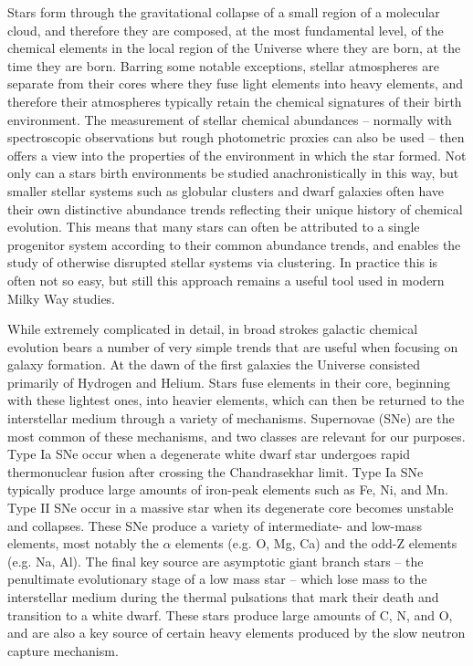 Stars form through the gravitational collapse of a small region of a molecular cloud, and therefore they are composed, at the most fundamental level, of the chemical elements in the local region of the Universe where they are born, at the time they are born. Barring some notable exceptions, stellar atmospheres are separate from their cores where they fuse light elements into heavy elements, and therefore their atmospheres typically retain the chemical signatures of their birth environment. The measurement of stellar chemical abundances -- normally with spectroscopic observations but rough photometric proxies can also be used -- then offers a view into the properties of the environment in which the star formed. Not only can a stars birth environments be studied anachronistically in this way, but smaller stellar systems such as globular clusters and dwarf galaxies often have their own distinctive abundance trends reflecting their unique history of chemical evolution. This means that many stars can often be attributed to a single progenitor system according to their common abundance trends, and enables the study of otherwise disrupted stellar systems via clustering. In practice this is often not so easy, but still this approach remains a useful tool used in modern Milky Way studies.

While extremely complicated in detail, in broad strokes galactic chemical evolution bears a number of very simple trends that are useful when focusing on galaxy formation. At the dawn of the first galaxies the Universe consisted primarily of Hydrogen and Helium. Stars fuse elements in their core, beginning with these lightest ones, into heavier elements, which can then be returned to the interstellar medium through a variety of mechanisms. Supernovae (SNe) are the most common of these mechanisms, and two classes are relevant for our purposes. Type Ia SNe occur when a degenerate white dwarf star undergoes rapid thermonuclear fusion after crossing the Chandrasekhar limit. Type Ia SNe typically produce large amounts of iron-peak elements such as Fe, Ni, and Mn. Type II SNe occur in a massive star when its degenerate core becomes unstable and collapses. These SNe produce a variety of intermediate- and low-mass elements, most notably the $\alpha$ elements (e.g. O, Mg, Ca) and the odd-Z elements (e.g. Na, Al). The final key source are asymptotic giant branch stars -- the penultimate evolutionary stage of a low mass star -- which lose mass to the interstellar medium during the thermal pulsations that mark their death and transition to a white dwarf. These stars produce large amounts of C, N, and O, and are also a key source of certain heavy elements produced by the slow neutron capture mechanism.

